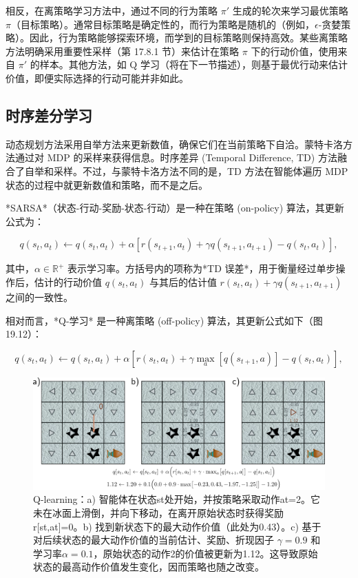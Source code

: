 相反，在离策略学习方法中，通过不同的行为策略 \(\pi \prime\) 生成的轮次来学习最优策略 \(\pi\)（目标策略）。通常目标策略是确定性的，而行为策略是随机的（例如，\(\epsilon\)-贪婪策略）。因此，行为策略能够探索环境，而学到的目标策略则保持高效。某些离策略方法明确采用重要性采样（第 17.8.1 节）来估计在策略 \(\pi\) 下的行动价值，使用来自 \(\pi \prime\) 的样本。其他方法，如 Q 学习（将在下一节描述），则基于最优行动来估计价值，即便实际选择的行动可能并非如此。

\subsection{时序差分学习}
动态规划方法采用自举方法来更新数值，确保它们在当前策略下自洽。蒙特卡洛方法通过对 MDP 的采样来获得信息。时序差异 (Temporal Difference, TD) 方法融合了自举和采样。不过，与蒙特卡洛方法不同的是，TD 方法在智能体遍历 MDP 状态的过程中就更新数值和策略，而不是之后。

*SARSA*（状态-行动-奖励-状态-行动）是一种在策略 (on-policy) 算法，其更新公式为：

\begin{equation}
q(s_t, a_t) \leftarrow q(s_t, a_t) + \alpha \left[ r(s_{t+1}, a_t) + \gamma q(s_{t+1}, a_{t+1}) - q(s_t, a_t) \right], 
\end{equation}

其中，\(\alpha \in \mathbb{R}^+\) 表示学习率。方括号内的项称为*TD 误差*，用于衡量经过单步操作后，估计的行动价值 \(q(s_t, a_t)\) 与其后的估计值 \(r(s_t, a_t)+\gamma q(s_{t+1}, a_{t+1})\) 之间的一致性。

相对而言，*Q-学习* 是一种离策略 (off-policy) 算法，其更新公式如下（图 19.12）：

\begin{equation}
q(s_t, a_t) \leftarrow q(s_t, a_t) + \alpha \left[ r(s_t, a_t) + \gamma \max_{a} [q(s_{t+1}, a)] - q(s_t, a_t) \right], 
\end{equation}

\begin{figure}[ht!]
\centering
\includegraphics[width=0.7\linewidth]{png/chapter19/ReinforceTD.png}
\caption{Q-learning：a) 智能体在状态st处开始，并按策略采取动作at=2。它未在冰面上滑倒，并向下移动，在离开原始状态时获得奖励r[st,at]=0。b) 找到新状态下的最大动作价值（此处为0.43）。c) 基于对后续状态的最大动作价值的当前估计、奖励、折现因子 \(\gamma=0.9\) 和学习率\(\alpha=0.1\)，原始状态的动作2的价值被更新为1.12。这导致原始状态的最高动作价值发生变化，因而策略也随之改变。}
\end{figure}

